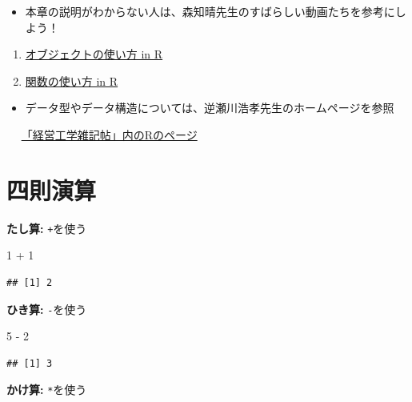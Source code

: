 \documentclass[
]{book}
\newenvironment{Shaded}{\begin{snugshade}}{\end{snugshade}}
\newcommand{\DecValTok}[1]{\textcolor[rgb]{0.00,0.00,0.81}{#1}}
\newcommand{\SpecialCharTok}[1]{\textcolor[rgb]{0.00,0.00,0.00}{#1}}
\providecommand{\tightlist}{%
  \setlength{\itemsep}{0pt}\setlength{\parskip}{0pt}}
\begin{document}
\begin{itemize}
\tightlist
\item
  本章の説明がわからない人は、森知晴先生のすばらしい動画たちを参考にしよう！
\end{itemize}

\begin{enumerate}
\def\labelenumi{\arabic{enumi}.}
\tightlist
\item
  \href{https://youtu.be/CblsIBlzqX0}{オブジェクトの使い方 in R}\\
\item
  \href{https://youtu.be/q8MI6P2hoUM}{関数の使い方 in R}
\end{enumerate}

\begin{itemize}
\tightlist
\item
  データ型やデータ構造については、逆瀬川浩孝先生のホームページを参照
\end{itemize}

　 \href{http://www.f.waseda.jp/sakas/R/index.html}{「経営工学雑記帖」内のRのページ}

\hypertarget{ux56dbux5247ux6f14ux7b97}{%
\section{四則演算}\label{ux56dbux5247ux6f14ux7b97}}

\textbf{たし算:} \texttt{+}を使う

\begin{Shaded}
\begin{Highlighting}[]
\DecValTok{1} \SpecialCharTok{+} \DecValTok{1}
\end{Highlighting}
\end{Shaded}

\begin{verbatim}
## [1] 2
\end{verbatim}

\textbf{ひき算:} \texttt{-}を使う

\begin{Shaded}
\begin{Highlighting}[]
\DecValTok{5} \SpecialCharTok{{-}} \DecValTok{2}
\end{Highlighting}
\end{Shaded}

\begin{verbatim}
## [1] 3
\end{verbatim}

\textbf{かけ算:} \texttt{*}を使う
\end{document}
